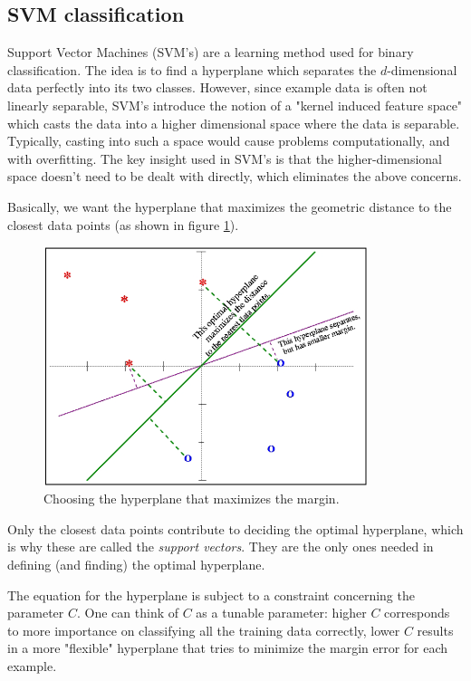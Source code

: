 \documentclass[runningheads,a4paper]{llncs}
\begin{document}
\subsection{SVM classification}
Support Vector Machines (SVM's) \cite{Boswell2002} are a learning method used for binary classification. The idea is to find a hyperplane which separates the $d$-dimensional data perfectly into its two classes. However, since example data is often not linearly separable, SVM's introduce the notion of a "kernel induced feature space" which casts the data into a higher dimensional space where the data is separable. Typically, casting into such a space would cause problems computationally, and with overfitting. The key insight used in SVM's is that the higher-dimensional space doesn't need to be dealt with directly, which eliminates the above concerns.

Basically, we want the hyperplane that maximizes the geometric distance to the closest data points (as shown in figure \ref{fig:hyperplane}).

\begin{figure}[H]
\centering
\includegraphics[height=7cm]{fig/SVM_hyperplane.png}
\caption{Choosing the hyperplane that maximizes the margin.}
\label{fig:hyperplane}
\end{figure}

Only the closest data points contribute to deciding the optimal hyperplane, which is why these are called the \textit{support vectors}. They are the only ones needed in defining (and finding) the optimal hyperplane. 

The equation for the hyperplane is subject to a constraint concerning the parameter $C$. 
One can think of $C$ as a tunable parameter: higher $C$ corresponds to more importance on classifying all the training data correctly, lower $C$ results in a more "flexible" hyperplane that tries to minimize the margin error for each example.
\end{document}

